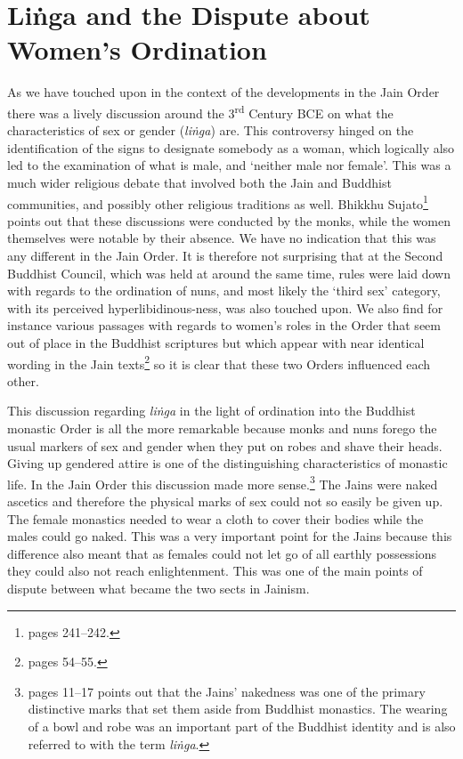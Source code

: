 \section{Liṅga and the Dispute about Women's Ordination}
\label{linga}

As we have touched upon in the context of the developments in the Jain Order there was a lively discussion around the 3\textsuperscript{rd} Century BCE on what the characteristics of sex or gender (\textit{liṅga}) are. This controversy hinged on the identification of the signs to designate somebody as a woman, which logically also led to the examination of what is male, and `neither male nor female'. This was a much wider religious debate that involved both the Jain and Buddhist communities, and possibly other religious traditions as well. Bhikkhu Sujato\footnote{\cite{sujato2009} pages 241–242.} points out that these discussions were conducted by the monks, while the women themselves were notable by their absence. We have no indication that this was any different in the Jain Order. It is therefore not surprising that at the Second Buddhist Council, which was held at around the same time, rules were laid down with regards to the ordination of nuns, and most likely the `third sex' category, with its perceived hyperlibidinous-ness, was also touched upon. We also find for instance various passages with regards to women's roles in the Order that seem out of place in the Buddhist scriptures but which appear with near identical wording in the Jain texts\footnote{\cite{sujato2009} pages 54–55.} so it is clear that these two Orders influenced each other.

This discussion regarding \textit{liṅga} in the light of ordination into the Buddhist monastic Order is all the more remarkable because monks and nuns forego the usual markers of sex and gender when they put on robes and shave their heads. Giving up gendered attire is one of the distinguishing characteristics of monastic life. In the Jain Order this discussion made more sense.\footnote{\cite{maes2016} pages 11–17 points out that the Jains' nakedness was one of the primary distinctive marks that set them aside from Buddhist monastics. The wearing of a bowl and robe was an important part of the Buddhist identity and is also referred to with the term \textit{liṅga}.} The Jains were naked ascetics and therefore the physical marks of sex could not so easily be given up. The female monastics needed to wear a cloth to cover their bodies while the males could go naked. This was a very important point for the Jains because this difference also meant that as females could not let go of all earthly possessions they could also not reach enlightenment. This was one of the main points of dispute between what became the two sects in Jainism.

